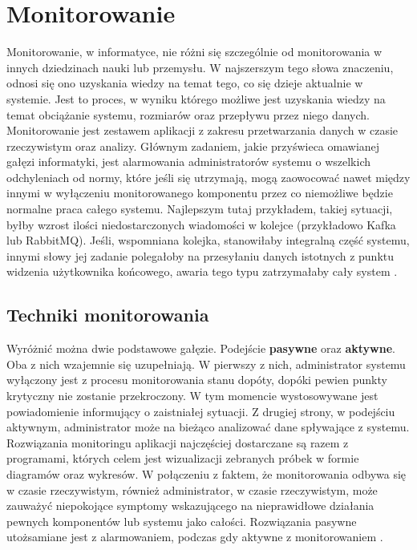\section{Monitorowanie}
    Monitorowanie, w informatyce, nie różni się szczególnie od monitorowania w innych dziedzinach nauki lub przemysłu. 
    W najszerszym tego słowa znaczeniu, odnosi się ono uzyskania wiedzy na temat tego, co się dzieje aktualnie w systemie.
    Jest to proces, w wyniku którego możliwe jest uzyskania wiedzy na temat obciążanie systemu, rozmiarów oraz przepływu przez niego
    danych. Monitorowanie jest zestawem aplikacji z zakresu przetwarzania danych w czasie rzeczywistym oraz analizy. 
    Głównym zadaniem, jakie przyświeca omawianej gałęzi informatyki, jest alarmowania administratorów systemu o wszelkich
    odchyleniach od normy, które jeśli się utrzymają, mogą zaowocować nawet między innymi w wyłączeniu monitorowanego
    komponentu przez co niemożliwe będzie normalne praca całego systemu. Najlepszym tutaj przykładem, takiej sytuacji, 
    byłby wzrost ilości niedostarczonych wiadomości w kolejce (przykładowo Kafka lub RabbitMQ). Jeśli, wspomniana kolejka,
    stanowiłaby integralną część systemu, innymi słowy jej zadanie polegałoby na przesyłaniu danych istotnych z punktu
    widzenia użytkownika końcowego, awaria tego typu zatrzymałaby cały system \cite{monitoring_and_alerting}.
    
    \subsection{Techniki monitorowania}
    Wyróżnić można dwie podstawowe gałęzie. Podejście \textbf{pasywne} oraz \textbf{aktywne}. Oba z nich wzajemnie się uzupełniają.
    W pierwszy z nich, administrator systemu wyłączony jest z procesu monitorowania stanu dopóty, dopóki pewien
    punkty krytyczny nie zostanie przekroczony. W tym momencie wystosowywane jest powiadomienie informujący o zaistniałej
    sytuacji. Z drugiej strony, w podejściu aktywnym, administrator może na bieżąco analizować dane spływające z systemu.
    Rozwiązania monitoringu aplikacji najczęściej dostarczane są razem z programami, których celem jest 
    wizualizacji zebranych próbek w formie diagramów oraz wykresów. W połączeniu z faktem, że monitorowania odbywa się
    w czasie rzeczywistym, również administrator, w czasie rzeczywistym, może zauważyć niepokojące symptomy wskazującego
    na nieprawidłowe działania pewnych komponentów lub systemu jako całości.
    Rozwiązania pasywne utożsamiane jest z alarmowaniem, podczas gdy aktywne z monitorowaniem \cite{monitoring_and_alerting}.
    
